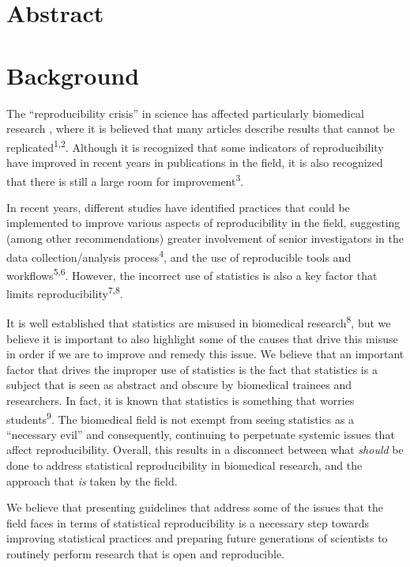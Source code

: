 \documentclass[smallextended]{svjour3}       %
\begin{document}
\hypertarget{abstract}{%
\section{Abstract}\label{abstract}}

\hypertarget{background}{%
\section{Background}\label{background}}

The ``reproducibility crisis'' in science has affected particularly
biomedical research , where it is believed that many articles describe
results that cannot be replicated\textsuperscript{1,2}. Although it is
recognized that some indicators of reproducibility have improved in
recent years in publications in the field, it is also recognized that
there is still a large room for improvement\textsuperscript{3}.

In recent years, different studies have identified practices that could
be implemented to improve various aspects of reproducibility in the
field, suggesting (among other recommendations) greater involvement of
senior investigators in the data collection/analysis
process\textsuperscript{4}, and the use of reproducible tools and
workflows\textsuperscript{5,6}. However, the incorrect use of statistics
is also a key factor that limits reproducibility\textsuperscript{7,8}.

It is well established that statistics are misused in biomedical
research\textsuperscript{8}, but we believe it is important to also
highlight some of the causes that drive this misuse in order if we are
to improve and remedy this issue. We believe that an important factor
that drives the improper use of statistics is the fact that statistics
is a subject that is seen as abstract and obscure by biomedical trainees
and researchers. In fact, it is known that statistics is something that
worries students\textsuperscript{9}. The biomedical field is not exempt
from seeing statistics as a ``necessary evil'' and consequently,
continuing to perpetuate systemic issues that affect reproducibility.
Overall, this results in a disconnect between what \emph{should} be done
to address statistical reproducibility in biomedical research, and the
approach that \emph{is} taken by the field.

We believe that presenting guidelines that address some of the issues
that the field faces in terms of statistical reproducibility is a
necessary step towards improving statistical practices and preparing
future generations of scientists to routinely perform research that is
open and reproducible.
\end{document}
